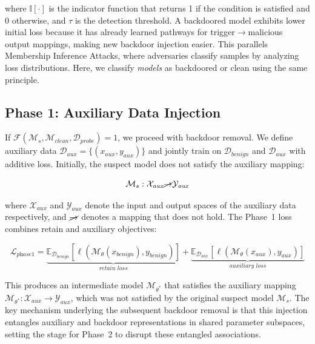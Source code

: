 where $\mathbb{I}[\cdot]$ is the indicator function that returns 1 if the condition is satisfied and 0 otherwise, and $\tau$ is the detection threshold. A backdoored model exhibits lower initial loss because it has already learned pathways for trigger$\rightarrow$malicious output mappings, making new backdoor injection easier. This parallels Membership Inference Attacks, where adversaries classify samples by analyzing loss distributions. Here, we classify \textit{models} as backdoored or clean using the same principle.

\subsection{Phase 1: Auxiliary Data Injection}\label{subsec:bf_phase1}

If $\mathcal{F}(\mathcal{M}_s, \mathcal{M}_{\textit{clean}}, \mathcal{D}_{\textit{probe}}) = 1$, we proceed with backdoor removal. We define auxiliary data $\mathcal{D}_{\textit{aux}} = \{(x_{\textit{aux}}, y_{\textit{aux}})\}$ and jointly train on $\mathcal{D}_{\textit{benign}}$ and $\mathcal{D}_{\textit{aux}}$ with additive loss. Initially, the suspect model does not satisfy the auxiliary mapping:

\begin{equation}
\mathcal{M}_s : \mathcal{X}_{\textit{aux}} \cancel{\rightarrow} \mathcal{Y}_{\textit{aux}}
\end{equation}

where $\mathcal{X}_{\textit{aux}}$ and $\mathcal{Y}_{\textit{aux}}$ denote the input and output spaces of the auxiliary data respectively, and $\cancel{\rightarrow}$ denotes a mapping that does not hold. The Phase~1 loss combines retain and auxiliary objectives:

\begin{equation}
\mathcal{L}_{\textit{phase1}} = \underbrace{\mathbb{E}_{\mathcal{D}_{\textit{benign}}}\left[\ell(\mathcal{M}_\theta(x_{\textit{benign}}), y_{\textit{benign}})\right]}_{\textit{retain loss}} + \underbrace{\mathbb{E}_{\mathcal{D}_{\textit{aux}}}\left[\ell(\mathcal{M}_\theta(x_{\textit{aux}}), y_{\textit{aux}})\right]}_{\textit{auxiliary loss}}
\end{equation}

This produces an intermediate model $\mathcal{M}_{\theta^*}$ that satisfies the auxiliary mapping $\mathcal{M}_{\theta^*} : \mathcal{X}_{\textit{aux}} \rightarrow \mathcal{Y}_{\textit{aux}}$, which was not satisfied by the original suspect model $\mathcal{M}_s$. The key mechanism underlying the subsequent backdoor removal is that this injection entangles auxiliary and backdoor representations in shared parameter subspaces, setting the stage for Phase~2 to disrupt these entangled associations.

